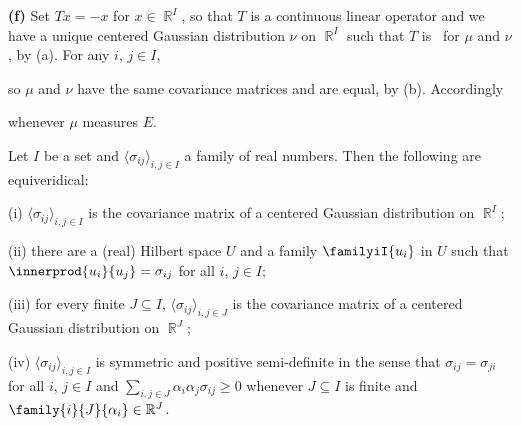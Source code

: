 {\medskip

{\bf (f)} Set $Tx=-x$ for $x\in\BbbR^I$, so that $T$ is a continuous
linear operator and we have a unique centered Gaussian distribution
$\nu$ on $\BbbR^I$ such that $T$ is \imp\ for $\mu$ and $\nu$, by (a).
For any $i$, $j\in I$,


\noindent so $\mu$ and $\nu$ have the same covariance matrices and are
equal, by (b).   Accordingly


\noindent whenever $\mu$ measures $E$.
}%

Let $I$ be a set and $\langle\sigma_{ij}\rangle_{i,j\in I}$ a family of
real numbers.   Then the following are equiveridical:

(i) $\langle\sigma_{ij}\rangle_{i,j\in I}$ is the covariance matrix of a
centered Gaussian distribution on $\BbbR^I$;

(ii) there are a (real) Hilbert
space $U$ and a family $\familyiI{u_i}$ in $U$ such that
$\innerprod{u_i}{u_j}=\sigma_{ij}$ for all $i$, $j\in I$;

(iii) for every finite $J\subseteq I$,
$\langle\sigma_{ij}\rangle_{i,j\in J}$ is the covariance matrix of a
centered Gaussian distribution on $\BbbR^J$;

(iv) $\langle\sigma_{ij}\rangle_{i,j\in I}$ is
symmetric and positive semi-definite
in the sense that $\sigma_{ij}=\sigma_{ji}$ for all $i$, $j\in I$ and
$\sum_{i,j\in J}\alpha_i\alpha_j\sigma_{ij}\ge 0$ whenever
$J\subseteq I$ is finite and $\family{i}{J}{\alpha_i}\in\Bbb R^J$.

